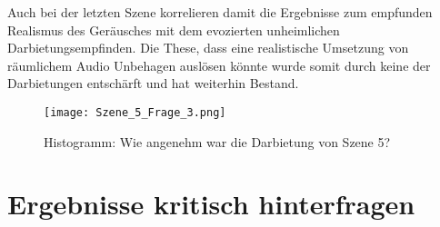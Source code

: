 Auch bei der letzten Szene korrelieren damit die Ergebnisse zum empfunden Realismus des Geräusches mit dem evozierten unheimlichen Darbietungsempfinden. Die These, dass eine realistische Umsetzung von räumlichem Audio Unbehagen auslösen könnte wurde somit durch keine der Darbietungen entschärft und hat weiterhin Bestand. 

   \begin{figure}[H]
\centering
\texttt{[image: Szene\_5\_Frage\_3.png]}
\caption{Histogramm: Wie angenehm war die Darbietung von Szene 5?}
\label{fig:Szene_5_Frage3}
\end{figure} 

 \section{Ergebnisse kritisch hinterfragen}
 






